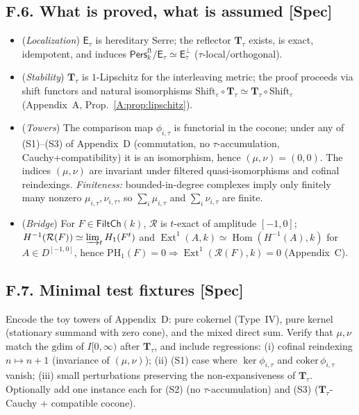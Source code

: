 \documentclass[11pt]{article}
\DeclareMathOperator{\Ext}{Ext}
\DeclareMathOperator{\Hom}{Hom}
\newcommand{\Pers}{\mathsf{Pers}}
\numberwithin{equation}{section}
\theoremstyle{definition}
\begin{document}
\subsection*{F.6. What is proved, what is assumed [Spec]}
\begin{itemize}
\item (\emph{Localization}) \(\mathsf{E}_\tau\) is hereditary Serre; the reflector \(\mathbf{T}_\tau\) exists, is exact,
idempotent, and induces \(\Pers^{\mathrm{ft}}_k/\mathsf{E}_\tau\simeq \mathsf{E}_\tau^\perp\) (\(\tau\)-local/orthogonal).
\item (\emph{Stability}) \(\mathbf{T}_\tau\) is \(1\)-Lipschitz for the interleaving metric; the proof proceeds via
shift functors and natural isomorphisms \(\mathrm{Shift}_\varepsilon\circ \mathbf{T}_\tau\simeq \mathbf{T}_\tau\circ \mathrm{Shift}_\varepsilon\) (Appendix~A, Prop.~\ref{A:prop:lipschitz}).
\item (\emph{Towers}) The comparison map \(\phi_{i,\tau}\) is functorial in the cocone; under any of (S1)–(S3)
of Appendix~D (commutation, no \(\tau\)-accumulation, Cauchy+compatibility) it is an isomorphism, hence
\((\mu,\nu)=(0,0)\). The indices \((\mu,\nu)\) are invariant under filtered quasi-isomorphisms and cofinal
reindexings. \emph{Finiteness:} bounded-in-degree complexes imply only finitely many nonzero \(\mu_{i,\tau},\nu_{i,\tau}\),
so \(\sum_i \mu_{i,\tau}\) and \(\sum_i \nu_{i,\tau}\) are finite.
\item (\emph{Bridge}) For \(F\in\mathsf{FiltCh}(k)\), \(\mathcal{R}\) is \(t\)-exact of amplitude \([-1,0]\);
\(H^{-1}(\mathcal{R}(F))\simeq \varinjlim_t H_1(F^t)\) and
\(\Ext^1(A,k)\simeq \Hom(H^{-1}(A),k)\) for \(A\in D^{[-1,0]}\), hence
\(\mathrm{PH}_1(F)=0\Rightarrow \Ext^1(\mathcal{R}(F),k)=0\) (Appendix~C).
\end{itemize}

\subsection*{F.7. Minimal test fixtures [Spec]}
Encode the toy towers of Appendix~D: pure cokernel (Type~IV), pure kernel (stationary summand with zero cone),
and the mixed direct sum. Verify that \(\mu,\nu\) match the \(\mathrm{gdim}\) of \(I[0,\infty)\) after \(\mathbf{T}_\tau\),
and include regressions:
(i) cofinal reindexing \(n\mapsto n+1\) (invariance of \((\mu,\nu)\));
(ii) (S1) case where \(\ker\phi_{i,\tau}\) and \(\mathrm{coker}\,\phi_{i,\tau}\) vanish;
(iii) small perturbations preserving the non-expansiveness of \(\mathbf{T}_\tau\).
Optionally add one instance each for (S2) (no \(\tau\)-accumulation) and (S3) (\(\mathbf{T}_\tau\)-Cauchy + compatible cocone).
\end{document}
